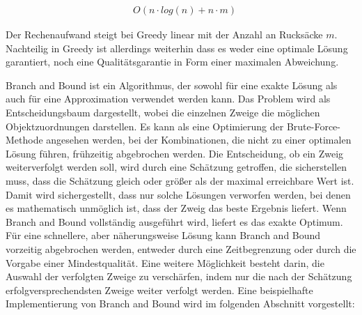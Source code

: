 \begin{align}
    & O(n \cdot log(n) + n \cdot m)
\end{align}

Der Rechenaufwand steigt bei Greedy linear mit der Anzahl an Rucksäcke $ m $. Nachteilig in Greedy ist allerdings weiterhin dass es weder eine optimale Lösung garantiert, noch eine Qualitätsgarantie in Form einer maximalen Abweichung. 

Branch and Bound ist ein Algorithmus, der sowohl für eine exakte Lösung als auch für eine Approximation verwendet werden kann. Das Problem wird als Entscheidungsbaum dargestellt, wobei die einzelnen Zweige die möglichen Objektzuordnungen darstellen. Es kann als eine Optimierung der Brute-Force-Methode angesehen werden, bei der Kombinationen, die nicht zu einer optimalen Lösung führen, frühzeitig abgebrochen werden. Die Entscheidung, ob ein Zweig weiterverfolgt werden soll, wird durch eine Schätzung getroffen, die sicherstellen muss, dass die Schätzung gleich oder größer als der maximal erreichbare Wert ist. Damit wird sichergestellt, dass nur solche Lösungen verworfen werden, bei denen es mathematisch unmöglich ist, dass der Zweig das beste Ergebnis liefert. Wenn Branch and Bound vollständig ausgeführt wird, liefert es das exakte Optimum. Für eine schnellere, aber näherungsweise Lösung kann Branch and Bound vorzeitig abgebrochen werden, entweder durch eine Zeitbegrenzung oder durch die Vorgabe einer Mindestqualität. Eine weitere Möglichkeit besteht darin, die Auswahl der verfolgten Zweige zu verschärfen, indem nur die nach der Schätzung erfolgversprechendsten Zweige weiter verfolgt werden. Eine beispielhafte Implementierung von Branch and Bound wird im folgenden Abschnitt vorgestellt:

